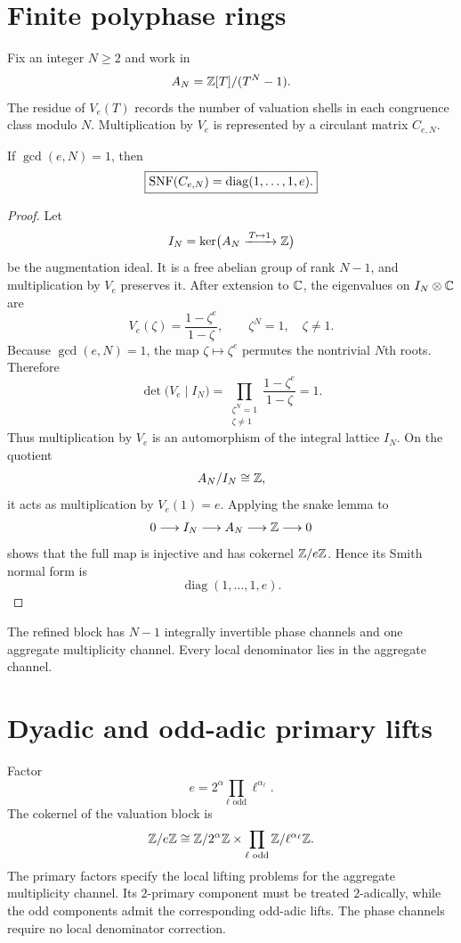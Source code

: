 \section{Finite polyphase rings}
Fix an integer $N\ge2$ and work in
\[
 A_N=\mathbb Z[T]/(T^N-1).
\]
The residue of $V_e(T)$ records the number of valuation shells in each congruence class modulo $N$. Multiplication by $V_e$ is represented by a circulant matrix $C_{e,N}$.

\begin{theorem}
If $\gcd(e,N)=1$, then
\[
 \boxed{
 \operatorname{SNF}(C_{e,N})
 =
 \operatorname{diag}(1,\ldots,1,e).
 }
\]
\end{theorem}

\begin{proof}
Let
\[
 I_N=\ker\bigl(A_N\xrightarrow{\,T\mapsto1\,}\mathbb Z\bigr)
\]
be the augmentation ideal. It is a free abelian group of rank $N-1$, and multiplication by $V_e$ preserves it. After extension to $\mathbb C$, the eigenvalues on $I_N\otimes\mathbb C$ are
\[
 V_e(\zeta)
 =
 \frac{1-\zeta^e}{1-\zeta},
 \qquad
 \zeta^N=1,
 \quad
 \zeta\neq1.
\]
Because $\gcd(e,N)=1$, the map $\zeta\mapsto\zeta^e$ permutes the nontrivial $N$th roots. Therefore
\[
 \det\bigl(V_e\mid I_N\bigr)
 =
 \prod_{\substack{\zeta^N=1\\\zeta\neq1}}
 \frac{1-\zeta^e}{1-\zeta}
 =1.
\]
Thus multiplication by $V_e$ is an automorphism of the integral lattice $I_N$. On the quotient
\[
 A_N/I_N\cong\mathbb Z,
\]
it acts as multiplication by $V_e(1)=e$. Applying the snake lemma to
\[
 0\longrightarrow I_N\longrightarrow A_N\longrightarrow\mathbb Z\longrightarrow0
\]
shows that the full map is injective and has cokernel $\mathbb Z/e\mathbb Z$. Hence its Smith normal form is
\[
 \operatorname{diag}(1,\ldots,1,e).
\]
\end{proof}

The refined block has $N-1$ integrally invertible phase channels and one aggregate multiplicity channel. Every local denominator lies in the aggregate channel.

\section{Dyadic and odd-adic primary lifts}
Factor
\[
 e=2^\alpha\prod_{\ell\text{ odd}}\ell^{\alpha_\ell}.
\]
The cokernel of the valuation block is
\[
 \mathbb Z/e\mathbb Z
 \cong
 \mathbb Z/2^\alpha\mathbb Z
 \times
 \prod_{\ell\text{ odd}}
 \mathbb Z/\ell^{\alpha_\ell}\mathbb Z.
\]
The primary factors specify the local lifting problems for the aggregate multiplicity channel. Its $2$-primary component must be treated $2$-adically, while the odd components admit the corresponding odd-adic lifts. The phase channels require no local denominator correction.

